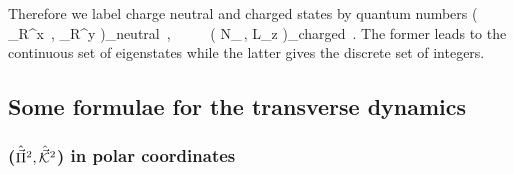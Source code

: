 Therefore we label charge neutral and charged states by quantum numbers
%
\beq
\big( \calK_R^x \,, \calK_R^y \big)_{\rm neutral} \,,~~~~~ \big( N_\calK \,, L_z \big)_{\rm charged} \,.
\eeq
%
The former leads to the continuous set of eigenstates while the latter gives the discrete set of integers.

\subsection{Some formulae for the transverse dynamics}
\label{sec:formulae}


\subsubsection{($ \hat{\vec{\Pi}}^2, \hat{\vec{\mathcal{K}}}^2$) in polar coordinates}
\label{sec:Pi2}

